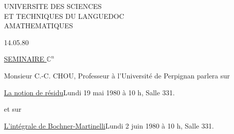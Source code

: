 
UNIVERSITE DES SCIENCES\\
ET TECHNIQUES DU LANGUEDOC\\
AMATHEMATIQUES

14.05.80

\uline{SEMINAIRE $\mathbb C^n$}

Monsieur C.-C. CHOU, Professeur à l'Université de Perpignan parlera sur

\uline{La notion de résidu}\qquad Lundi 19 mai 1980 à 10 h, Salle 331.

et sur

\uline{L'intégrale de Bochner-Martinelli}\qquad Lundi 2 juin 1980 à 10 h, Salle 331.

